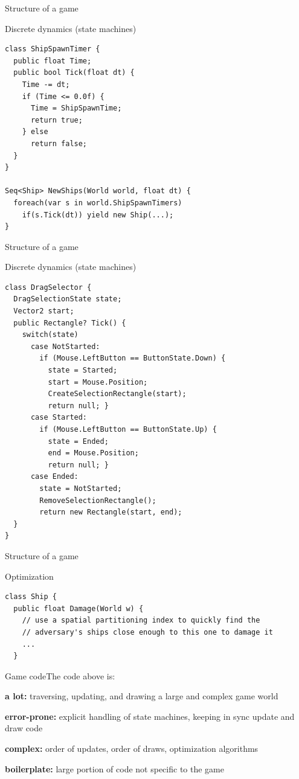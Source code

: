 \documentclass{beamer}
\begin{document}
\begin{frame}[fragile]{Structure of a game}
\begin{block}{Discrete dynamics (state machines)}
\begin{lstlisting}
class ShipSpawnTimer {
  public float Time;
  public bool Tick(float dt) {
    Time -= dt;
    if (Time <= 0.0f) {
      Time = ShipSpawnTime;
      return true;
    } else
      return false;
  }
}

Seq<Ship> NewShips(World world, float dt) {
  foreach(var s in world.ShipSpawnTimers)
    if(s.Tick(dt)) yield new Ship(...);
}
\end{lstlisting}
\end{block}
\end{frame}

\begin{frame}[fragile]{Structure of a game}
\begin{block}{Discrete dynamics (state machines)}
\begin{lstlisting}
class DragSelector {
  DragSelectionState state;
  Vector2 start;
  public Rectangle? Tick() {
    switch(state)
      case NotStarted:
        if (Mouse.LeftButton == ButtonState.Down) {
          state = Started;
          start = Mouse.Position;
          CreateSelectionRectangle(start);
          return null; }
      case Started:
        if (Mouse.LeftButton == ButtonState.Up) {
          state = Ended;
          end = Mouse.Position;
          return null; }
      case Ended:
        state = NotStarted;
        RemoveSelectionRectangle();
        return new Rectangle(start, end);
  }
}
\end{lstlisting}
\end{block}
\end{frame}

\begin{frame}[fragile]{Structure of a game}
\begin{block}{Optimization}
\begin{lstlisting}
class Ship {
  public float Damage(World w) {
    // use a spatial partitioning index to quickly find the 
    // adversary's ships close enough to this one to damage it
    ...
  }
\end{lstlisting}
\end{block}
\end{frame}

\begin{slide}{Game code}{The code above is:}{
\item \textbf{a lot:} traversing, updating, and drawing a large and complex game world
\item \textbf{error-prone:} explicit handling of state machines, keeping in sync update and draw code
\item \textbf{complex:} order of updates, order of draws, optimization algorithms
\item \textbf{boilerplate:} large portion of code not specific to the game
}\end{slide}
\end{document}
